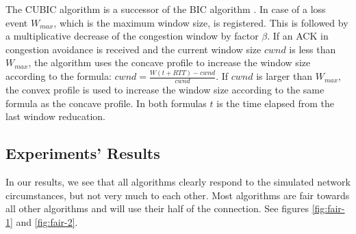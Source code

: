 \documentclass{article}
\begin{document}
The CUBIC algorithm is a successor of the BIC algorithm \cite{cubic-tcp-congestion}. In case of a loss event $W_{max}$, which is the maximum window size, is registered. This is followed by a multiplicative decrease of the congestion window by factor $\beta$. If an ACK in congestion avoidance is received and the current window size $cwnd$ is less than $W_{max}$, the algorithm uses the concave profile to increase the window size according to the formula: $cwnd = \frac{W(t+RTT)-cwnd}{cwnd}$. If $cwnd$ is larger than $W_{max}$, the convex profile is used to increase the window size according to the same formula as the concave profile. In both formulas $t$ is the time elapsed from the last window reducation.


\subsection{Experiments' Results}\label{sub:experiment-results}

In our results, we see that all algorithms clearly respond to the simulated
network circumstances, but not very much to each other. Most algorithms are
fair towards all other algorithms and will use their half of the connection.
See figures \ref{fig:fair-1} and \ref{fig:fair-2}.
\end{document}
